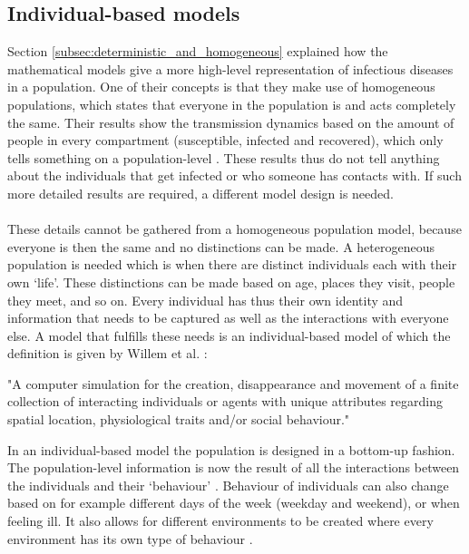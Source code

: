 \subsection{Individual-based models}
\label{subsec:individual-based_models}
Section \ref{subsec:deterministic_and_homogeneous} explained how the mathematical models give a more high-level representation of infectious diseases in a population. One of their concepts is that they make use of homogeneous populations, which states that everyone in the population is and acts completely the same. Their results show the transmission dynamics based on the amount of people in every compartment (susceptible, infected and recovered), which only tells something on a population-level \cite{compartmental_model}. These results thus do not tell anything about the individuals that get infected or who someone has contacts with. If such more detailed results are required, a different model design is needed.
\\\\
These details cannot be gathered from a homogeneous population model, because everyone is then the same and no distinctions can be made. A heterogeneous population is needed which is when there are distinct individuals each with their own `life'. These distinctions can be made based on age, places they visit, people they meet, and so on. Every individual has thus their own identity and information that needs to be captured as well as the interactions with everyone else. A model that fulfills these needs is an individual-based model of which the definition is given by Willem et al. \cite{lander_lessons_decade, lander_phd}:
\begin{quoting}
"A computer simulation for the creation, disappearance and movement of a finite collection of interacting individuals or agents with unique attributes regarding spatial location, physiological traits and/or social behaviour."
\end{quoting}

In an individual-based model the population is designed in a bottom-up fashion. The population-level information is now the result of all the interactions between the individuals and their `behaviour' \cite{lander_lessons_decade}. Behaviour of individuals can also change based on for example different days of the week (weekday and weekend), or when feeling ill. It also allows for different environments to be created where every environment has its own type of behaviour \cite{introduction_agent-based_models}.

